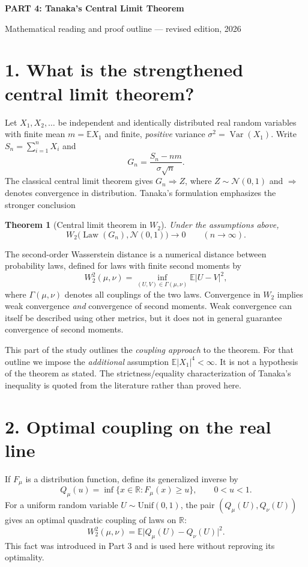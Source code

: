 \documentclass[10pt,a4paper]{article}
\newtheorem{theorem}{Theorem}\newtheorem{lemma}{Lemma}\newtheorem{remark}{Remark}
\newcommand{\Law}{\operatorname{Law}}
\newcommand{\E}{\mathbb E}
\newcommand{\Var}{\operatorname{Var}}
\newcommand{\N}{\mathcal N}
\newcommand{\W}{W_2}
\begin{document}
\begin{center}
{\Large\bfseries PART 4: Tanaka's Central Limit Theorem}\par
\vspace{2pt}
{\normalsize Mathematical reading and proof outline --- revised edition, 2026}
\end{center}
\vspace{8pt}

\section*{1. What is the strengthened central limit theorem?}
Let $X_1,X_2,\ldots$ be independent and identically distributed real random variables with finite mean $m=\E X_1$ and finite, \emph{positive} variance $\sigma^2=\Var(X_1)$. Write $S_n=\sum_{i=1}^n X_i$ and
\[
G_n=\frac{S_n-nm}{\sigma\sqrt n}.
\]
The classical central limit theorem gives $G_n\Rightarrow Z$, where $Z\sim\N(0,1)$ and $\Rightarrow$ denotes convergence in distribution. Tanaka's formulation emphasizes the stronger conclusion
\begin{theorem}[Central limit theorem in $W_2$]
Under the assumptions above,
\[
\W\bigl(\Law(G_n),\N(0,1)\bigr)\longrightarrow0
\qquad(n\longrightarrow\infty).
\]
\end{theorem}
The second-order Wasserstein distance is a numerical distance between probability laws, defined for laws with finite second moments by
\[
\W^2(\mu,\nu)=\inf_{(U,V)\in\Gamma(\mu,\nu)}\E|U-V|^2,
\]
where $\Gamma(\mu,\nu)$ denotes all couplings of the two laws. Convergence in $W_2$ implies weak convergence \emph{and} convergence of second moments. Weak convergence can itself be described using other metrics, but it does not in general guarantee convergence of second moments.

This part of the study outlines the \emph{coupling approach} to the theorem. For that outline we impose the \emph{additional} assumption $\E|X_1|^4<\infty$. It is not a hypothesis of the theorem as stated. The strictness/equality characterization of Tanaka's inequality is quoted from the literature rather than proved here.

\section*{2. Optimal coupling on the real line}
If $F_\mu$ is a distribution function, define its generalized inverse by
\[
Q_\mu(u)=\inf\{x\in\mathbb R:F_\mu(x)\ge u\},\qquad0<u<1.
\]
For a uniform random variable $U\sim\mathrm{Unif}(0,1)$, the pair $(Q_\mu(U),Q_\nu(U))$ gives an optimal quadratic coupling of laws on $\mathbb R$:
\[
\W^2(\mu,\nu)=\E\bigl|Q_\mu(U)-Q_\nu(U)\bigr|^2.
\]
This fact was introduced in Part 3 and is used here without reproving its optimality.
\end{document}

